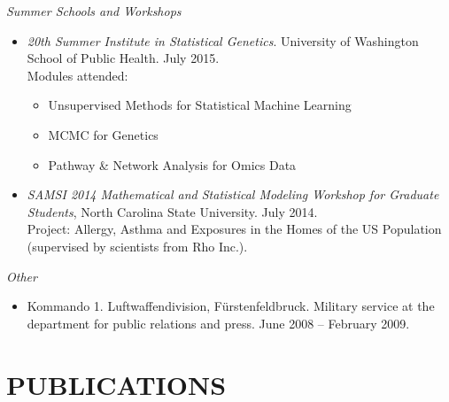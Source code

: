 \documentclass[margin]{res} %
\begin{document}
\begin{resume}

{\sl Summer Schools and Workshops} 
\begin{itemize}
\item {\it 20th Summer Institute in Statistical Genetics}. University of Washington School of Public Health. July 2015. \\
  Modules attended: 
  \begin{itemize}
    \item Unsupervised Methods for Statistical Machine Learning
    \item MCMC for Genetics
    \item Pathway \& Network Analysis for Omics Data
  \end{itemize}
\item {\it SAMSI 2014 Mathematical and Statistical Modeling Workshop for Graduate Students}, North Carolina State University. July 2014.\\
  Project: Allergy, Asthma and Exposures in the Homes of the US Population (supervised by scientists from Rho Inc.).
\end{itemize} 

{\sl Other}
\begin{itemize}
\item Kommando 1. Luftwaffendivision, F\"{u}rstenfeldbruck. Military service at the department for public relations and press. June 2008 -- February 2009.
\end{itemize} 

\section{PUBLICATIONS}


\nocite{*}


\end{resume}
\end{document}
